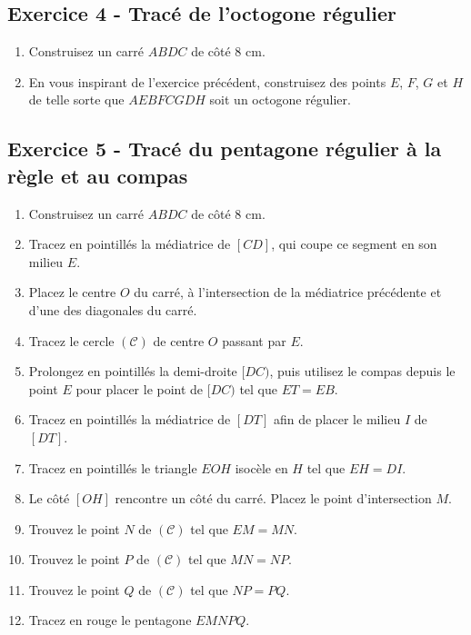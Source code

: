 \documentclass[14 pt]{extarticle}
\theoremstyle{plain}
\begin{document}
\subsection*{Exercice 4 - Tracé de l'octogone régulier}


\begin{enumerate}

\item Construisez un carré $ABDC$ de côté $8$ cm. 
\item En vous inspirant de l'exercice précédent, construisez des points $E$, $F$, $G$ et $H$ de telle sorte que $AEBFCGDH$ soit un octogone régulier.
\end{enumerate}


\subsection*{Exercice 5 - Tracé du pentagone régulier à la règle et au compas}


\begin{enumerate}

\item Construisez un carré $ABDC$ de côté $8$ cm. 
\item Tracez en pointillés la médiatrice de $[CD]$, qui coupe ce segment en son milieu $E$. 
\item Placez le centre $O$ du carré, à l'intersection de la médiatrice précédente et d'une des diagonales du carré. 
\item Tracez le cercle $(\mathcal C)$ de centre $O$ passant par $E$. 
\item Prolongez en pointillés la demi-droite $[DC)$, puis utilisez le compas depuis le point $E$ pour placer le point de $[DC)$ tel que $ET=EB$. 
\item Tracez en pointillés la médiatrice de $[DT]$ afin de placer le milieu $I$ de $[DT]$. 
\item Tracez en pointillés le triangle $EOH$ isocèle en $H$ tel que $EH= DI$. 
\item Le côté $[OH]$ rencontre un côté du carré. Placez le point d'intersection $M$.
\item Trouvez le point $N$ de $(\mathcal C)$ tel que $EM= MN$. 
\item Trouvez le point $P$ de $(\mathcal C)$ tel que $MN=NP$. 
\item Trouvez le point $Q$ de $(\mathcal C)$ tel que $NP=PQ$. 
\item Tracez en rouge le pentagone $EMNPQ$. 
\end{enumerate}
\end{document}
